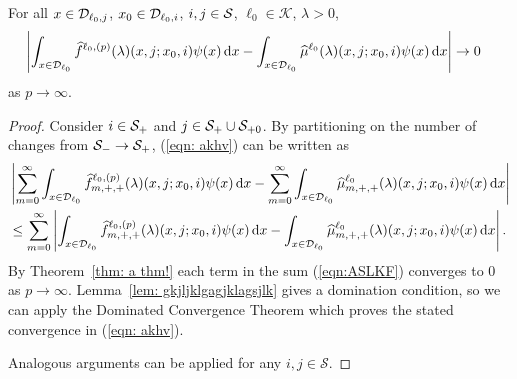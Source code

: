 \begin{lem} \label{lem:vn4}
	For all \(x\in\mathcal{D}_{\ell_0,j}\), \(x_0\in\mathcal{D}_{\ell_0,i}\), \(i,j\in\mathcal{S}\), \(\ell_0\in\mathcal K\), \(\lambda > 0\),  
	\begin{align}
		&\left|\int_{x\in\mathcal{D}_{\ell_0}}\widehat f^{\ell_0,(p)}(\lambda)(x,j;x_0,i)\psi(x) \, \mathrm{d} x - \int_{x\in\mathcal{D}_{\ell_0}}\widehat \mu^{\ell_0}(\lambda)( x,j; x_0,i)\psi(x) \, \mathrm{d} x\right|\to 0  \label{eqn: akhv}
	\end{align}
	as \(p\to\infty\). 
\end{lem}
\begin{proof}
	 
	
	Consider \(i\in\mathcal{S}_+\) and \(j\in\mathcal{S}_+\cup\mathcal{S}_{+0}\). By partitioning on the number of changes from \(\mathcal{S}_-\to\mathcal{S}_+\), (\ref{eqn: akhv}) can be written as
	\begin{align}
		&\left|\sum_{m=0}^\infty \int_{x\in\mathcal{D}_{\ell_0}}\widehat f^{\ell_0,(p)}_{m,+,+}(\lambda)(x,j;x_0,i)\psi(x)\, \mathrm{d} x
		-
		\sum_{m=0}^\infty \int_{x\in\mathcal{D}_{\ell_0}} \widehat \mu^{\ell_0}_{m,+,+}(\lambda)(x,j;x_0,i)\psi(x)\, \mathrm{d} x\right| \nonumber
		\\&\leq \sum_{m=0}^\infty \left| \int_{x\in\mathcal{D}_{\ell_0}}\widehat f^{\ell_0,(p)}_{m,+,+}(\lambda)(x,j;x_0,i)\psi(x)\, \mathrm{d} x
		-
		\int_{x\in\mathcal{D}_{\ell_0}} \widehat \mu^{\ell_0}_{m,+,+}(\lambda)(x,j;x_0,i)\psi(x)\, \mathrm{d} x\right|. \label{eqn:ASLKF}
        \end{align}
        By Theorem~\ref{thm: a thm!} each term in the sum (\ref{eqn:ASLKF}) converges to \(0\) as \(p\to\infty\). Lemma~\ref{lem: gkjljklgagjklagsjlk} gives a domination condition, so we can apply the Dominated Convergence Theorem which proves the stated convergence in (\ref{eqn: akhv}).
        
        Analogous arguments can be applied for any \(i,j\in\mathcal S\). 
\end{proof}


